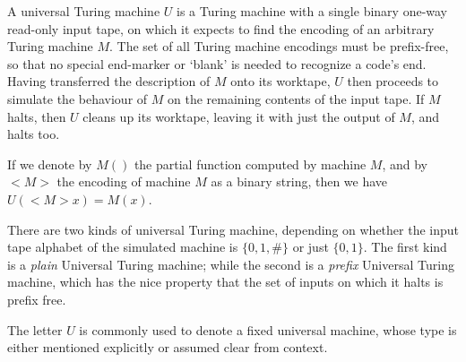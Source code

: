 \documentclass[12pt]{article}
\begin{document}
A universal Turing machine $U$ is a Turing machine with a single binary
one-way read-only input tape, on which it expects to find the encoding of an arbitrary Turing machine $M$. The set of all Turing machine encodings must
be prefix-free, so that no special end-marker or `blank' is needed to recognize
a code's end. Having transferred the description of $M$ onto its worktape,
$U$ then proceeds to simulate the behaviour of $M$ on the remaining
contents of the input tape. If $M$ halts, then $U$ cleans up its worktape,
leaving it with just the output of $M$, and halts too.

If we denote by $M()$ the partial function computed by machine $M$,
and by $<M>$ the encoding of machine $M$ as a binary string,
then we have $U(<M>x)=M(x)$.

There are two kinds of universal Turing machine, depending on whether the
input tape alphabet of the simulated machine is $\{0,1,\#\}$ or just $\{0,1\}$.
The first kind is a {\em plain} Universal Turing machine;
while the second is a {\em prefix} Universal Turing machine,
which has the nice property
that the set of inputs on which it halts is prefix free.

The letter $U$ is commonly used to denote a fixed universal machine, whose
type is either mentioned explicitly or assumed clear from context.
\end{document}
